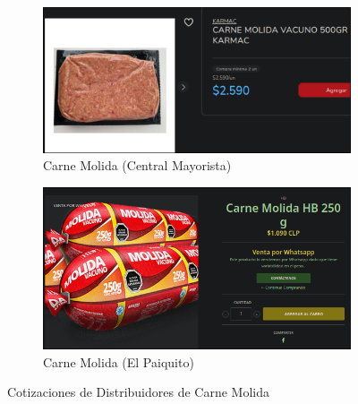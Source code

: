 \documentclass[12pt]{article}
\begin{document}
        \begin{figure}[h!] %
            \centering
            \begin{subfigure}{0.45\textwidth}
                \centering
                \includegraphics[width=0.9\linewidth]{central} %
                \caption{Carne Molida (Central Mayorista)}
                \label{fig:central_mayorista}
            \end{subfigure}
            \hfill
            \begin{subfigure}{0.45\textwidth}
                \centering
                \includegraphics[width=0.9\linewidth]{paiquito} %
                \caption{Carne Molida (El Paiquito)}
                \label{fig:paiquito_carne}
            \end{subfigure}
            \caption{Cotizaciones de Distribuidores de Carne Molida}
            \label{fig:cotizaciones_carne_molida}
        \end{figure} %
        \newpage
\end{document}
